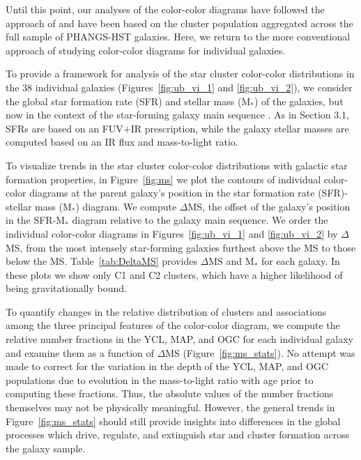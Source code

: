 \documentclass[linenumbers]{aastex63}
\begin{document}
{Until this point, our analyses of the color-color diagrams have followed the approach of \citet{lee23ubvi} and have been based on the cluster population aggregated across the full sample of PHANGS-HST galaxies.  Here, we return to the more conventional approach of studying color-color diagrams for individual galaxies.

To provide a framework for analysis of the star cluster color-color distributions in the 38 individual galaxies (Figures~\ref{fig:ub_vi_1} and \ref{fig:ub_vi_2}), we consider the global star formation rate (SFR) and stellar mass (M$_*$) of the galaxies, but now in the context of the star-forming galaxy main sequence \citep[e.g.,][]{salim_uv_2007, noeske_star_2007, lee_star_2007}.  As in Section 3.1, SFRs are based on an FUV$+$IR prescription, while the galaxy stellar masses are computed based on an IR flux and mass-to-light ratio.

To visualize trends in the star cluster color-color distributions with galactic star formation properties, in  Figure~\ref{fig:ms} we plot the contours of individual color-color diagrams at the parent galaxy’s position in the star formation rate (SFR)-stellar mass (M$_*$) diagram.  We compute $\Delta$MS, the offset of the galaxy's position in the SFR-M$_*$ diagram relative to the galaxy main sequence.   We order the individual color-color diagrams in Figures~\ref{fig:ub_vi_1} and \ref{fig:ub_vi_2} by $\Delta$MS, from the most intensely star-forming galaxies furthest above the MS to those below the MS.  Table~\ref{tab:DeltaMS} provides $\Delta$MS and M$_*$ for each galaxy.  In these plots we show only C1 and C2 clusters, which have a higher likelihood of being gravitationally bound.  

To quantify changes in the relative distribution of clusters and associations among the three principal features of the color-color diagram, we compute the relative number fractions in the YCL, MAP, and OGC for each individual galaxy and examine them as a function of $\Delta$MS (Figure~\ref{fig:ms_stats}). No attempt was made to correct for the variation in the depth of the YCL, MAP, and OGC populations due to evolution in the mass-to-light ratio with age prior to computing these fractions.  Thus, the absolute values of the number fractions themselves may not be physically meaningful.  However, the general trends in Figure~\ref{fig:ms_stats} should still provide insights into differences in the global processes which drive, regulate, and extinguish star and cluster formation across the galaxy sample.
 
}
\end{document}
